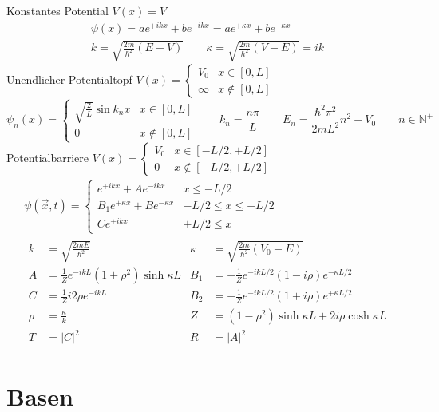Konstantes Potential $V(x)=V$ \cite[Glg. 4.5]{qm}
\begin{gather*}
	\psi(x)=ae^{+ikx}+be^{-ikx}=ae^{+\kappa x}+be^{-\kappa x} \\
	k=\sqrt{\frac{2m}{\hbar^2}(E-V)} \qquad \kappa=\sqrt{\frac{2m}{\hbar^2}(V-E)}=ik
\end{gather*}
Unendlicher Potentialtopf $V(x)=\begin{cases} V_0 & x\in[0,L] \\ \infty & x\not\in[0,L] \end{cases}$ \cite[Glg. 4.7-4.9]{qm}
\begin{equation*}
	\psi_n(x)=\begin{cases}
		\sqrt{\frac{2}{L}}\sin k_nx & x\in[0,L] \\
		0                           & x\not\in[0,L]
	\end{cases} \qquad k_n=\frac{n\pi}{L} \qquad E_n=\frac{\hbar^2\pi^2}{2mL^2}n^2+V_0 \qquad n\in\mathbb{N}^+
\end{equation*}
Potentialbarriere $V(x)=\begin{cases} V_0 & x\in[-L/2,+L/2] \\ 0 & x\not\in[-L/2,+L/2] \end{cases}$ \cite[Glg. 4.53, 4.48, 4.49, 4.54]{qm}
\begin{gather*}
	\psi(\vec{x},t) = \begin{cases}
		e^{+ikx}+Ae^{-ikx} & x\leq-L/2 \\
		B_1e^{+\kappa x} + Be^{-\kappa x} & -L/2\leq x\leq+L/2 \\
		Ce^{+ikx} & +L/2\leq x
	\end{cases} \\
	\begin{aligned}
		k &= \sqrt{\frac{2mE}{\hbar^2}} & \kappa &= \sqrt{\frac{2m}{\hbar^2}(V_0-E)} \\
		A &= \frac{1}{Z}e^{-ikL}(1+\rho^2)\sinh\kappa L & B_1 &= -\frac{1}{Z}e^{-ikL/2}(1-i\rho)e^{-\kappa L/2} \\
		C &= \frac{1}{Z}i2\rho e^{-ikL} & B_2 &= +\frac{1}{Z}e^{-ikL/2}(1+i\rho)e^{+\kappa L/2} \\
			\rho &= \frac{\kappa}{k} & Z &= (1-\rho^2)\sinh\kappa L + 2i\rho\cosh\kappa L \\
		T &= |C|^2 & R &= |A|^2
	\end{aligned}
\end{gather*}

\section{Basen}

